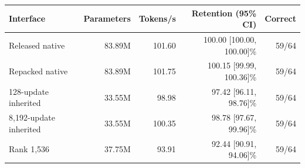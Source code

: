 \begin{tabular}{lrrrr}
\toprule
Interface & Parameters & Tokens/s & Retention (95\% CI) & Correct \\
\midrule
Released native & 83.89M & 101.60 & 100.00 [100.00, 100.00]\% & 59/64 \\
Repacked native & 83.89M & 101.75 & 100.15 [99.99, 100.36]\% & 59/64 \\
128-update inherited & 33.55M & 98.98 & 97.42 [96.11, 98.76]\% & 59/64 \\
8,192-update inherited & 33.55M & 100.35 & 98.78 [97.67, 99.96]\% & 59/64 \\
Rank 1,536 & 37.75M & 93.91 & 92.44 [90.91, 94.06]\% & 59/64 \\
\bottomrule
\end{tabular}
